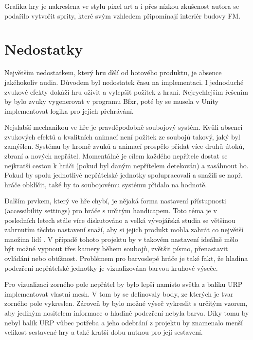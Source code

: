 \documentclass[FM,Proj,bw]{tulthesis}
\begin{document}
	Grafika hry je nakreslena ve stylu pixel art a i přes nízkou zkušenost autora se podařilo vytvořit sprity, které svým vzhledem připomínají interiér budovy FM.
	
	\section{Nedostatky} %
	
	Největším nedostatkem, který hru dělí od hotového produktu, je absence jakéhokoliv audia. Důvodem byl nedostatek času na implementaci. I jednoduché zvukové efekty dokáží hru oživit a vylepšit požitek z hraní. Nejrychlejším řešením by bylo zvuky vygenerovat v programu Bfxr, poté by se musela v Unity implementovat logika pro jejich přehrávání.
	
	Nejslabší mechanikou ve hře je pravděpodobně soubojový systém. Kvůli absenci zvukových efektů a kvalitních animací není požitek ze soubojů takový, jaký byl zamýšlen. Systému by kromě zvuků a animací prospělo přidat více druhů útoků, zbraní a nových nepřátel. Momentálně je cílem každého nepřítele dostat se nejkratší cestou k hráči (pokud byl daným nepřítelem detekován) a zasáhnout ho. Pokud by spolu jednotlivé nepřátelské jednotky spolupracovali a snažili se např. hráče obklíčit, také by to soubojovému systému přidalo na hodnotě.
	
	Dalším prvkem, který ve hře chybí, je nějaká forma nastavení přístupnosti (accessibility settings) pro hráče s určitým handicapem. Toto téma je v posledních letech stále více diskutováno a velká vývojářská studia se většinou zahrnutím těchto nastavení snaží, aby si jejich produkt mohla zahrát co největší množina lidí \cite{disability}. V případě tohoto projektu by v takovém nastavení ideálně mělo být možné vypnout třes kamery během soubojů, zvětšit písmo, přenastavit ovládání nebo obtížnost. Problémem pro barvoslepé hráče je také fakt, že hladina podezření nepřátelské jednotky je vizualizována barvou kruhové výseče.
	
	
	Pro vizualizaci zorného pole nepřátel by bylo lepší namísto světla z balíku URP implementovat vlastní mesh. V tom by se definovaly body, ze kterých je tvar zorného pole vykreslen. Zároveň by bylo možné výseč vykreslit s určitým vzorem, aby jediným nositelem informace o hladině podezření nebyla barva. Díky tomu by nebyl balík URP vůbec potřeba a jeho odebrání z projektu by znamenalo menší velikost sestavené hry a také kratší dobu nutnou pro její sestavení.
	
\end{document}
